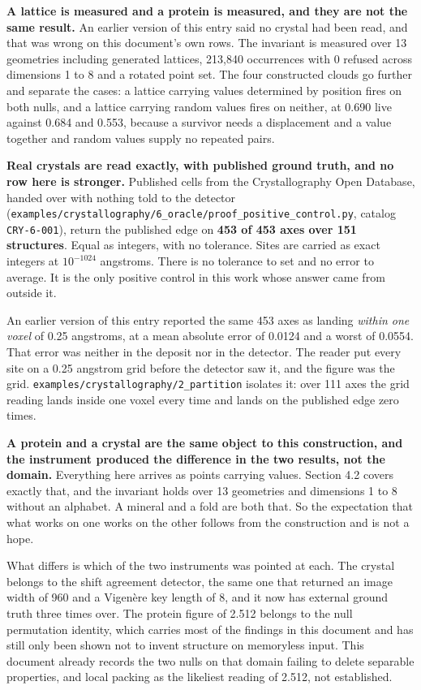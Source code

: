 \textbf{A lattice is measured and a protein is measured, and they are not the same result.} An earlier version of this entry said no crystal had been read, and that was wrong on this document's own rows. The invariant is measured over 13 geometries including generated lattices, 213,840 occurrences with 0 refused across dimensions 1 to 8 and a rotated point set. The four constructed clouds go further and separate the cases: a lattice carrying values determined by position fires on both nulls, and a lattice carrying random values fires on neither, at 0.690 live against 0.684 and 0.553, because a survivor needs a displacement and a value together and random values supply no repeated pairs.

\textbf{Real crystals are read exactly, with published ground truth, and no row here is stronger.} Published cells from the Crystallography Open Database, handed over with nothing told to the detector (\texttt{examples/\allowbreak{}crystallography/\allowbreak{}6\_\allowbreak{}oracle/\allowbreak{}proof\_\allowbreak{}positive\_\allowbreak{}control.\allowbreak{}py}, catalog \texttt{CRY-6-001}), return the published edge on \textbf{453 of 453 axes over 151 structures}. Equal as integers, with no tolerance. Sites are carried as exact integers at \(10^{-1024}\) angstroms. There is no tolerance to set and no error to average. It is the only positive control in this work whose answer came from outside it.

An earlier version of this entry reported the same 453 axes as landing \emph{within one voxel} of 0.25 angstroms, at a mean absolute error of 0.0124 and a worst of 0.0554. That error was neither in the deposit nor in the detector. The reader put every site on a 0.25 angstrom grid before the detector saw it, and the figure was the grid. \texttt{examples/\allowbreak{}crystallography/\allowbreak{}2\_\allowbreak{}partition} isolates it: over 111 axes the grid reading lands inside one voxel every time and lands on the published edge zero times.

\textbf{A protein and a crystal are the same object to this construction, and the instrument produced the difference in the two results, not the domain.} Everything here arrives as points carrying values. Section 4.2 covers exactly that, and the invariant holds over 13 geometries and dimensions 1 to 8 without an alphabet. A mineral and a fold are both that. So the expectation that what works on one works on the other follows from the construction and is not a hope.

What differs is which of the two instruments was pointed at each. The crystal belongs to the shift agreement detector, the same one that returned an image width of 960 and a Vigenère key length of 8, and it now has external ground truth three times over. The protein figure of 2.512 belongs to the null permutation identity, which carries most of the findings in this document and has still only been shown not to invent structure on memoryless input. This document already records the two nulls on that domain failing to delete separable properties, and local packing as the likeliest reading of 2.512, not established.

